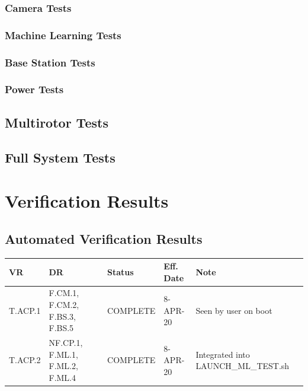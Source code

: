 \documentclass[10pt,letterpaper]{article}
\begin{document}
\subsubsection{Camera Tests}


\subsubsection{Machine Learning Tests}


\subsubsection{Base Station Tests}


\subsubsection{Power Tests}


\subsection{Multirotor Tests}


\subsection{Full System Tests}


\section{Verification Results} \label{results}

\subsection{Automated Verification Results}
\begin{table}[H]
	\centering
	\begin{tabular}{lllll}
	\hline
	\textbf{VR} & \textbf{DR} & \textbf{Status} & \textbf{Eff. Date} & \textbf{Note}\\
	\hline
	T.ACP.1 & F.CM.1, F.CM.2, F.BS.3, F.BS.5 & COMPLETE   &8-APR-20 & Seen by user on boot\\
	T.ACP.2 & NF.CP.1, F.ML.1, F.ML.2, F.ML.4 & COMPLETE  &8-APR-20 & Integrated into LAUNCH\_ML\_TEST.sh\\
	\hline
	\end{tabular}
\end{table}
\end{document}
